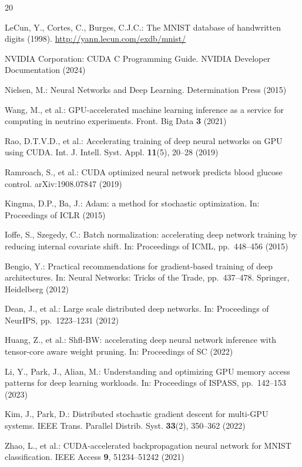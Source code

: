 \documentclass[runningheads]{llncs}
\begin{document}
%
%
\begin{thebibliography}{20}

LeCun, Y., Cortes, C., Burges, C.J.C.: The MNIST database of handwritten
digits (1998). \url{http://yann.lecun.com/exdb/mnist/}

NVIDIA Corporation: CUDA C Programming Guide. NVIDIA Developer
Documentation (2024)

Nielsen, M.: Neural Networks and Deep Learning. Determination Press (2015)

Wang, M., et al.: GPU-accelerated machine learning inference as a service
for computing in neutrino experiments. Front. Big Data \textbf{3} (2021)

Rao, D.T.V.D., et al.: Accelerating training of deep neural networks on
GPU using CUDA. Int. J. Intell. Syst. Appl. \textbf{11}(5), 20--28 (2019)

Ramroach, S., et al.: CUDA optimized neural network predicts blood glucose
control. arXiv:1908.07847 (2019)

Kingma, D.P., Ba, J.: Adam: a method for stochastic optimization. In:
Proceedings of ICLR (2015)

Ioffe, S., Szegedy, C.: Batch normalization: accelerating deep network
training by reducing internal covariate shift. In: Proceedings of ICML,
pp.~448--456 (2015)

Bengio, Y.: Practical recommendations for gradient-based training of deep
architectures. In: Neural Networks: Tricks of the Trade, pp.~437--478.
Springer, Heidelberg (2012)

Dean, J., et al.: Large scale distributed deep networks. In: Proceedings
of NeurIPS, pp.~1223--1231 (2012)

Huang, Z., et al.: Shfl-BW: accelerating deep neural network inference
with tensor-core aware weight pruning. In: Proceedings of SC (2022)

Li, Y., Park, J., Alian, M.: Understanding and optimizing GPU memory
access patterns for deep learning workloads. In: Proceedings of ISPASS,
pp.~142--153 (2023)

Kim, J., Park, D.: Distributed stochastic gradient descent for multi-GPU
systems. IEEE Trans. Parallel Distrib. Syst. \textbf{33}(2),
350--362 (2022)

Zhao, L., et al.: CUDA-accelerated backpropagation neural network for
MNIST classification. IEEE Access \textbf{9}, 51234--51242 (2021)


\end{thebibliography}
\end{document}

